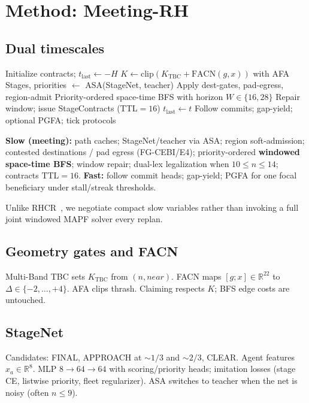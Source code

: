 \documentclass[11pt,a4paper]{article}
\begin{document}
\section{Method: Meeting-RH}
\subsection{Dual timescales}
\begin{algorithm}[t]
\caption{Meeting-RH tick loop (conceptual)}
\label{alg:meet}
\begin{algorithmic}[1]
\State Initialize contracts; $t_{\mathrm{last}}\leftarrow -H$
    \State $K\leftarrow\mathrm{clip}(K_{\mathrm{TBC}}+\mathrm{FACN}(g,x))$ with AFA
    \State Stages, priorities $\leftarrow$ ASA(StageNet, teacher)
    \State Apply dest-gates, pad-egress, region-admit
    \State Priority-ordered space-time BFS with horizon $W\in\{16,28\}$
    \State Repair window; issue StageContracts (TTL${=}16$)
    \State $t_{\mathrm{last}}\leftarrow t$
  \EndIf
  \State Follow commits; gap-yield; optional PGFA; tick protocols
\EndFor
\end{algorithmic}
\end{algorithm}

\textbf{Slow (meeting):} path caches; StageNet/teacher via ASA; region soft-admission; contested destinations / pad egress (FG-CEBI/E4); priority-ordered \textbf{windowed space-time BFS}; window repair; dual-lex legalization when $10\le n\le 14$; contracts TTL${=}16$.
\textbf{Fast:} follow commit heads; gap-yield; PGFA for one focal beneficiary under stall/streak thresholds.

Unlike RHCR~\citep{li2021rhcr}, we negotiate compact slow variables rather than invoking a full joint windowed MAPF solver every replan.

\subsection{Geometry gates and FACN}
Multi-Band TBC sets $K_{\mathrm{TBC}}$ from $(n,\textit{near})$. FACN maps $[g;x]\in\mathbb{R}^{22}$ to $\Delta\in\{-2,\ldots,+4\}$. AFA clips thrash. Claiming respects $K$; BFS edge costs are untouched.

\subsection{StageNet}
Candidates: FINAL, APPROACH at $\sim\!1/3$ and $\sim\!2/3$, CLEAR. Agent features $x_a\in\mathbb{R}^{8}$. MLP $8{\to}64{\to}64$ with scoring/priority heads; imitation losses (stage CE, listwise priority, fleet regularizer). ASA switches to teacher when the net is noisy (often $n\le 9$).
\end{document}
